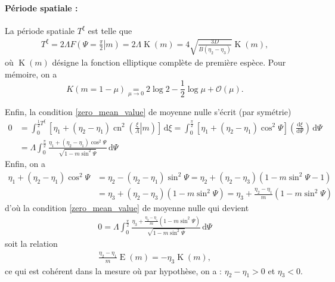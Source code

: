 \documentclass[10pt,a4paper, oneside, fleqn]{myarticle}
\newcommand{\dd}{\mathrm{d}}
\newcommand{\idd}{\,\mathrm{d}}
\newcommand{\grandO}{\mathscr{O}}
\DeclareMathOperator{\ellipE}{E}
\DeclareMathOperator{\ellipK}{K}
\DeclareMathOperator{\cn}{cn}
\begin{document}
\paragraph{Période spatiale :} La période spatiale $T^\xi$ est telle que
\begin{gather}
  T^\xi = 2 \Lambda F\left(\left.\Psi=\frac{\pi}{2}\right\vert m\right)= 2\Lambda \ellipK(m) = 4 \sqrt{\frac{3D}{B (\eta_2-\eta_3)}}\ellipK(m), \label{expr_Txi}
\end{gather}
où $\ellipK(m)$ désigne la fonction elliptique complète de première espèce. Pour mémoire, on a
\begin{equation}
  K(m = 1-\mu) \underset{\mu\to 0}{=} 2 \log 2 - \frac 1 2 \log \mu + \grandO(\mu).
\end{equation}

\medskip

Enfin, la condition \eqref{zero_mean_value} de moyenne nulle s'écrit (par symétrie)
\begin{align}
  0&=\int_0^{\frac{1}{2}T^\xi} \left[\eta_1 + (\eta_2-\eta_1) \cn^2 \left(\left. \frac{\xi}{\Lambda} \right\vert m\right)\right]\idd \xi = \int_0^{\frac{\pi}{2}}\left[\eta_1 + (\eta_2-\eta_1) \cos^2 \Psi\right] \left(\frac{\dd \xi}{\dd \Psi}\right)\idd \Psi\\
   &= \Lambda %
     \int_0^{\frac{\pi}{2}}\frac{\eta_1 + (\eta_2-\eta_1) \cos^2 \Psi}{\sqrt{1-m\sin^2\Psi}} \idd \Psi
\end{align}
Enfin, on a
\begin{align}
  \eta_1 + (\eta_2-\eta_1) \cos^2 \Psi &= \eta_2 -(\eta_2-\eta_1)\sin^2\Psi=\eta_2 + (\eta_2-\eta_3) (1-m\sin^2\Psi-1)\\
  & = \eta_3 + (\eta_2-\eta_3) (1-m\sin^2\Psi) = \eta_3 + \frac{\eta_2-\eta_1}{m} (1-m\sin^2\Psi)
\end{align}
d'où la condition \eqref{zero_mean_value} de moyenne nulle qui devient 
\begin{align}
  0= %
  \Lambda\int_0^{\frac{\pi}{2}}\frac{\eta_3 + \frac{\eta_2-\eta_1}{m} (1-m\sin^2\Psi)}{\sqrt{1-m\sin^2\Psi}} \idd \Psi
\end{align}
soit la relation
\begin{align}
  \frac{\eta_2-\eta_1}{m}\ellipE(m) = -\eta_3\ellipK(m), \label{condition_zero_mean}
\end{align}
ce qui est cohérent dans la mesure où par hypothèse, on a : \;$\eta_2-\eta_1>0$ \; et \; $\eta_3<0$.
\end{document}
